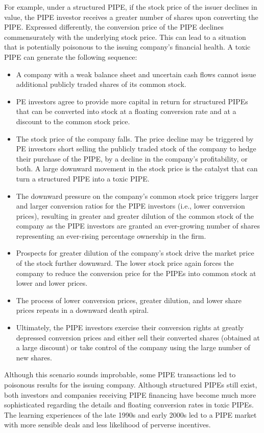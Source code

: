 \documentclass[11pt]{article}
\begin{document}
For example, under a structured PIPE, if the stock price of the issuer declines in value, the PIPE investor receives a greater number of shares upon converting the PIPE. Expressed differently, the conversion price of the PIPE declines commensurately with the underlying stock price. This can lead to a situation that is potentially poisonous to the issuing company's financial health. A toxic PIPE can generate the following sequence:

\begin{itemize}
  \item A company with a weak balance sheet and uncertain cash flows cannot issue additional publicly traded shares of its common stock.
  \item PE investors agree to provide more capital in return for structured PIPEs that can be converted into stock at a floating conversion rate and at a discount to the common stock price.
  \item The stock price of the company falls. The price decline may be triggered by PE investors short selling the publicly traded stock of the company to hedge their purchase of the PIPE, by a decline in the company's profitability, or both. A large downward movement in the stock price is the catalyst that can turn a structured PIPE into a toxic PIPE.
  \item The downward pressure on the company's common stock price triggers larger and larger conversion ratios for the PIPE investors (i.e., lower conversion prices), resulting in greater and greater dilution of the common stock of the company as the PIPE investors are granted an ever-growing number of shares representing an ever-rising percentage ownership in the firm.
  \item Prospects for greater dilution of the company's stock drive the market price of the stock further downward. The lower stock price again forces the company to reduce the conversion price for the PIPEs into common stock at lower and lower prices.
  \item The process of lower conversion prices, greater dilution, and lower share prices repeats in a downward death spiral.
  \item Ultimately, the PIPE investors exercise their conversion rights at greatly depressed conversion prices and either sell their converted shares (obtained at a large discount) or take control of the company using the large number of new shares.
\end{itemize}

Although this scenario sounds improbable, some PIPE transactions led to poisonous results for the issuing company. Although structured PIPEs still exist, both investors and companies receiving PIPE financing have become much more sophisticated regarding the details and floating conversion rates in toxic PIPEs. The learning experiences of the late 1990s and early 2000s led to a PIPE market with more sensible deals and less likelihood of perverse incentives.
\end{document}
